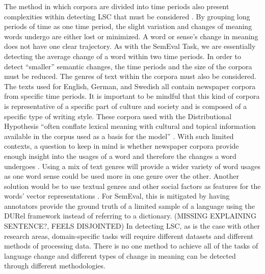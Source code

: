 The method in which corpora are divided into time periods also present complexities within detecting LSC that must be considered \citep{hengchen2021challenges}. By grouping long periods of time as one time period, the slight variation and changes of meaning words undergo are either lost or minimized. A word or sense’s change in meaning does not have one clear trajectory. As with the SemEval Task, we are essentially detecting the average change of a word within two time periods. In order to detect “smaller” semantic changes, the time periods and the size of the corpora must be reduced. The genres of text within the corpora must also be considered. The texts used for English, German, and Swedish all contain newspaper corpora from specific time periods. It is important to be mindful that this kind of corpora is representative of a specific part of culture and society and is composed of a specific type of writing style. These corpora used with the Distributional Hypothesis “often conflate lexical meaning with cultural and topical information available in the corpus used as a basis for the model” \citep{hengchen2021challenges}. With such limited contexts, a question to keep in mind is whether newspaper corpora provide enough insight into the usages of a word and therefore the changes a word undergoes \citep{hengchen2021challenges}. Using a mix of text genres will provide a wider variety of word usages as one word sense could be used more in one genre over the other. Another solution would be to use textual genres and other social factors as features for the words' vector representations \citep{perrone-etal-2019-gasc, jawahar-seddah-2019-contextualized}. For SemEval, this is mitigated by having annotators provide the ground truth of a limited sample of a language using the DURel framework \citep{DURel2018} instead of referring to a dictionary. (MISSING EXPLAINING SENTENCE?, FEELS DISJOINTED) In detecting LSC, as is the case with other research areas, domain-specific tasks will require different datasets and different methods of processing data. There is no one method to achieve all of the tasks of language change and different types of change in meaning can be detected through different methodologies. 
